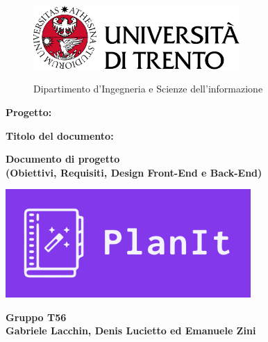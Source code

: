 \begin{titlepage}
    \begin{figure}[!htb]
        \includegraphics[width=0.7\textwidth]{img/logo_unitn.png}
        \endminipage
        \hfill
        \begin{flushright}
            \Large
            Dipartimento d'Ingegneria e Scienze dell'informazione
        \end{flushright}
        \endminipage
        \hfill
    \end{figure}

    \vspace{3cm}

    \large
    \textbf{Progetto:}
    \begin{center}
        \Huge
        \color{blue}
        \textbf{\nome}
    \end{center}

    \vspace{1cm}

    \textbf{Titolo del documento:}
    \begin{center}
        \huge
        \color{blue}
        \textbf{Documento di progetto}\\
        \textbf{(Obiettivi, Requisiti, Design Front-End e Back-End)}
    \end{center}

    \vspace{2cm}

    \begin{center}
        \includegraphics[width=0.7\textwidth, height=0.2\textheight]{img/LogoNuovo.png}
    \end{center}
    \vspace{2cm}

    \begin{center}
        \large
        \textbf{Gruppo T56}\\
        \textbf{Gabriele Lacchin, Denis Lucietto ed Emanuele Zini}
    \end{center}

\end{titlepage}
